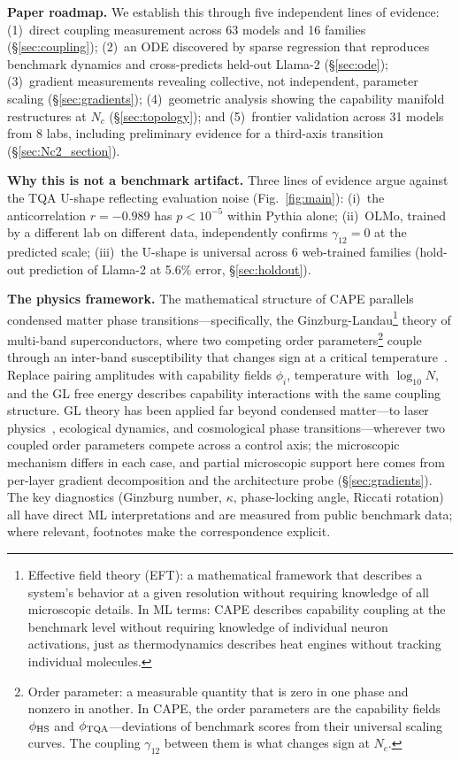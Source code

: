 \documentclass[11pt]{article}
\begin{document}
\smallskip
\noindent\textbf{Paper roadmap.}
We establish this through five independent lines of evidence: (1)~direct coupling measurement across 63 models and 16 families (\S\ref{sec:coupling}); (2)~an ODE discovered by sparse regression that reproduces benchmark dynamics and cross-predicts held-out Llama-2 (\S\ref{sec:ode}); (3)~gradient measurements revealing collective, not independent, parameter scaling (\S\ref{sec:gradients}); (4)~geometric analysis showing the capability manifold restructures at $N_c$ (\S\ref{sec:topology}); and (5)~frontier validation across 31 models from 8 labs, including preliminary evidence for a third-axis transition (\S\ref{sec:Nc2_section}).

\smallskip
\textbf{Why this is not a benchmark artifact.}
Three lines of evidence argue against the TQA U-shape reflecting evaluation noise (Fig.~\ref{fig:main}):
(i)~the anticorrelation $r=-0.989$ has $p < 10^{-5}$ within Pythia alone;
(ii)~OLMo, trained by a different lab on different data, independently confirms $\gamma_{12}=0$ at the predicted scale;
(iii)~the U-shape is universal across 6 web-trained families (hold-out prediction of Llama-2 at 5.6\% error, \S\ref{sec:holdout}).

\textbf{The physics framework.}
The mathematical structure of CAPE parallels condensed matter phase transitions---specifically, the Ginzburg-Landau\footnote{Effective field theory (EFT): a mathematical framework that describes a system's behavior at a given resolution without requiring knowledge of all microscopic details. In ML terms: CAPE describes capability coupling at the benchmark level without requiring knowledge of individual neuron activations, just as thermodynamics describes heat engines without tracking individual molecules.} theory of multi-band superconductors, where two competing order parameters\footnote{Order parameter: a measurable quantity that is zero in one phase and nonzero in another. In CAPE, the order parameters are the capability fields $\phi_{\rm HS}$ and $\phi_{\rm TQA}$---deviations of benchmark scores from their universal scaling curves. The coupling $\gamma_{12}$ between them is what changes sign at $N_c$.} couple through an inter-band susceptibility that changes sign at a critical temperature~\cite{amin2020}.
Replace pairing amplitudes with capability fields $\phi_i$, temperature with $\log_{10} N$, and the GL free energy describes capability interactions with the same coupling structure.
GL theory has been applied far beyond condensed matter---to laser physics~\cite{haken1985}, ecological dynamics, and cosmological phase transitions---wherever two coupled order parameters compete across a control axis; the microscopic mechanism differs in each case, and partial microscopic support here comes from per-layer gradient decomposition and the architecture probe (\S\ref{sec:gradients}).
The key diagnostics (Ginzburg number, $\kappa$, phase-locking angle, Riccati rotation) all have direct ML interpretations and are measured from public benchmark data; where relevant, footnotes make the correspondence explicit.
\end{document}
